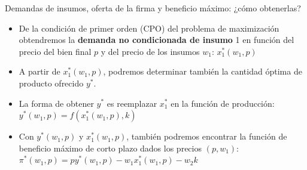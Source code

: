 \documentclass{beamer}
\theoremstyle{definition}
\begin{document}
\begin{frame}{\small Demandas de insumos, oferta de la firma y beneficio máximo: ¿cómo obtenerlas?}
	\begin{itemize}
		\item De la condici\'{o}n de primer orden (CPO) del problema de maximizaci\'{o}n obtendremos la \textbf{demanda no condicionada de insumo} 1 en funci\'{o}n del precio del bien final $p$ y del precio de los insumos $w_1$: $x_{1}^{*}(w_{1},p)$
		\item A partir de $x_{1}^{*}(w_{1},p)$, podremos determinar tambi\'{e}n la cantidad \'{o}ptima de producto ofrecido $y^*$. 
		
		\item La forma de obtener $y^*$ es reemplazar $x_1^*$ en la función de producci\'{o}n: $y^{*}(w_{1},p)=f(x_{1}^{*}(w_{1},p),k)$
		\item Con $y^{*}(w_{1},p)$ y $x_{1}^{*}(w_{1},p)$, tambi\'en podremos encontrar la funci\'{o}n de beneficio m\'{a}ximo de corto plazo dados los precios $(p,w_1)$: $\pi^*(w_{1},p)=py^{*}(w_{1},p)-w_{1}x_{1}^{*}(w_{1},p)-w_{2}k$
	\end{itemize}
	
\end{frame}	


	
\end{document}
